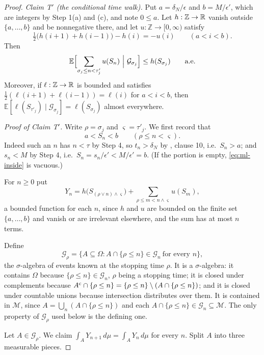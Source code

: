 \begin{proof}
\emph{Claim T$'$ (the conditional time walk).} Put $a=\delta_N/\epsilon$ and
$b=M/\epsilon'$, which are integers by Step 1(a) and (c), and note
$0\le a$. Let $h:\mathbb Z\to\mathbb{R}$ vanish outside $\{a,\dots,b\}$ and be
nonnegative there, and let $u:\mathbb Z\to[0,\infty)$ satisfy
\begin{equation}\label{eq:ml-poisson}
  \tfrac12\bigl(h(i+1)+h(i-1)\bigr)-h(i)=-u(i)\qquad(a<i<b).
\end{equation}
Then
\[
  \mathbb E\Bigl[\sum_{\sigma_j\le n<\tau'_j}u(S_n)\ \Big|\
      \mathcal G_{\sigma_j}\Bigr]\le h(S_{\sigma_j})\qquad\text{a.e.}
\]
Moreover, if $\ell:\mathbb Z\to\mathbb{R}$ is bounded and satisfies
$\tfrac12(\ell(i+1)+\ell(i-1))=\ell(i)$ for $a<i<b$, then
$\mathbb E[\ell(S_{\tau'_j})\mid\mathcal G_{\sigma_j}]=\ell(S_{\sigma_j})$
almost everywhere.

\emph{Proof of Claim T$'$.} Write $\rho=\sigma_j$ and $\varsigma=\tau'_j$. We
first record that
\begin{equation}\label{eq:ml-inside}
  a<S_n<b\qquad(\rho\le n<\varsigma).
\end{equation}
Indeed such an $n$ has $n<\tau$ by Step 4, so $t_n>\delta_N$ by
, clause 10, i.e.\ $S_n>a$; and $s_n<M$ by Step 4, i.e.\
$S_n=s_n/\epsilon'<M/\epsilon'=b$. (If the portion is empty,
\eqref{eq:ml-inside} is vacuous.)

For $n\ge0$ put
\[
  Y_n=h\bigl(S_{(\rho\vee n)\wedge\varsigma}\bigr)
      +\sum_{\rho\le m<n\wedge\varsigma}u(S_m),
\]
a bounded function for each $n$, since $h$ and $u$ are bounded on the finite set
$\{a,\dots,b\}$ and vanish or are irrelevant elsewhere, and the sum has at most
$n$ terms.

Define
\[
  \mathcal G_\rho=\bigl\{A\subseteq\Omega:
     A\cap\{\rho\le n\}\in\mathcal G_n\ \text{for every }n\bigr\},
\]
the $\sigma$-algebra of events known at the stopping time $\rho$. It is a
$\sigma$-algebra: it contains $\Omega$ because $\{\rho\le n\}\in\mathcal G_n$,
$\rho$ being a stopping time; it is closed under complements because
$A^{\rm c}\cap\{\rho\le n\}=\{\rho\le n\}\setminus(A\cap\{\rho\le n\})$; and it
is closed under countable unions because intersection distributes over them. It
is contained in $\mathcal M$, since $A=\bigcup_n(A\cap\{\rho\le n\})$ and each
$A\cap\{\rho\le n\}\in\mathcal G_n\subseteq\mathcal M$. The only property of
$\mathcal G_\rho$ used below is the defining one.

Let $A\in\mathcal G_\rho$. We
claim $\int_AY_{n+1}\,d\mu=\int_AY_n\,d\mu$ for every $n$. Split $A$ into three
measurable pieces.


\end{proof}
